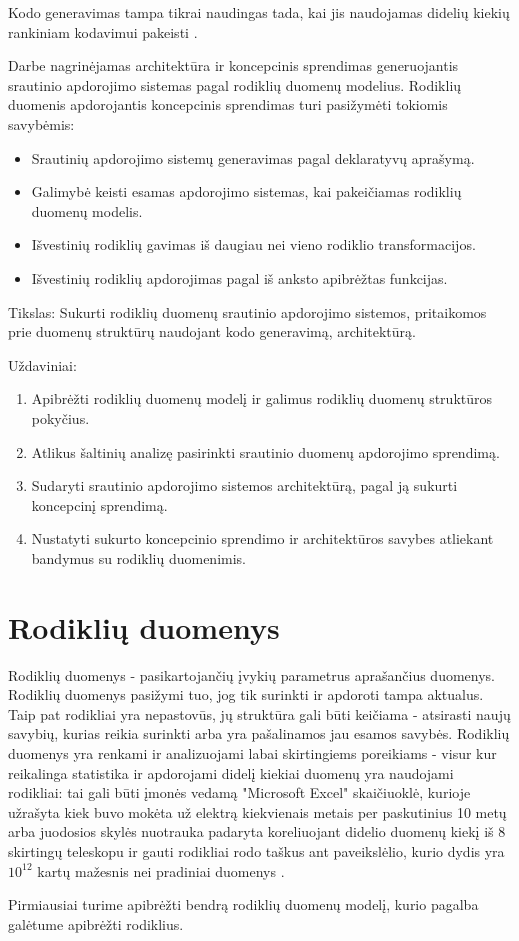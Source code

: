 \documentclass{VUMIFPSbakalaurinis}
\begin{document}
Kodo generavimas tampa tikrai naudingas tada, kai jis naudojamas didelių kiekių rankiniam kodavimui pakeisti \cite{herrington2003code}. \par
Darbe nagrinėjamas architektūra ir koncepcinis sprendimas generuojantis srautinio apdorojimo sistemas pagal rodiklių duomenų modelius. Rodiklių duomenis apdorojantis koncepcinis sprendimas turi pasižymėti tokiomis savybėmis: 
\begin{itemize}
    \item Srautinių apdorojimo sistemų generavimas pagal deklaratyvų aprašymą.
    \item Galimybė keisti esamas apdorojimo sistemas, kai pakeičiamas rodiklių duomenų modelis.
    \item Išvestinių rodiklių gavimas iš daugiau nei vieno rodiklio transformacijos.
    \item Išvestinių rodiklių apdorojimas pagal iš anksto apibrėžtas funkcijas.
\end{itemize}  

Tikslas: Sukurti rodiklių duomenų srautinio apdorojimo sistemos, pritaikomos prie duomenų struktūrų naudojant kodo generavimą, architektūrą.

Uždaviniai:
\begin{enumerate}
    \item Apibrėžti rodiklių duomenų modelį ir galimus rodiklių duomenų struktūros pokyčius.
    \item Atlikus šaltinių analizę pasirinkti srautinio duomenų apdorojimo sprendimą.
    \item Sudaryti srautinio apdorojimo sistemos architektūrą, pagal ją sukurti koncepcinį sprendimą. 
    \item Nustatyti sukurto koncepcinio sprendimo ir architektūros savybes atliekant bandymus su rodiklių duomenimis.
\end{enumerate}

\section{Rodiklių duomenys}

Rodiklių duomenys - pasikartojančių įvykių parametrus aprašančius duomenys. Rodiklių duomenys pasižymi tuo, jog tik surinkti ir apdoroti tampa aktualus. Taip pat rodikliai yra nepastovūs, jų struktūra gali būti keičiama - atsirasti naujų savybių, kurias reikia surinkti arba yra pašalinamos jau esamos savybės. Rodiklių duomenys yra renkami ir analizuojami labai skirtingiems poreikiams - visur kur reikalinga statistika ir apdorojami didelį kiekiai duomenų yra naudojami rodikliai: tai gali būti įmonės vedamą "Microsoft Excel" skaičiuoklė, kurioje užrašyta kiek buvo mokėta už elektrą kiekvienais metais per paskutinius 10 metų arba juodosios skylės nuotrauka padaryta koreliuojant didelio duomenų kiekį iš 8 skirtingų teleskopu ir gauti rodikliai rodo taškus ant paveikslėlio, kurio dydis yra \(10^{12}\) kartų mažesnis nei pradiniai duomenys \cite{akiyama2019first}. \par    
Pirmiausiai turime apibrėžti bendrą rodiklių duomenų modelį, kurio pagalba galėtume apibrėžti rodiklius. 
\end{document}
